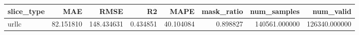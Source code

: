 \begin{tabular}{lrrrrrrr}
\toprule
slice_type & MAE & RMSE & R2 & MAPE & mask_ratio & num_samples & num_valid \\
\midrule
urllc & 82.151810 & 148.434631 & 0.434851 & 40.104084 & 0.898827 & 140561.000000 & 126340.000000 \\
\bottomrule
\end{tabular}
